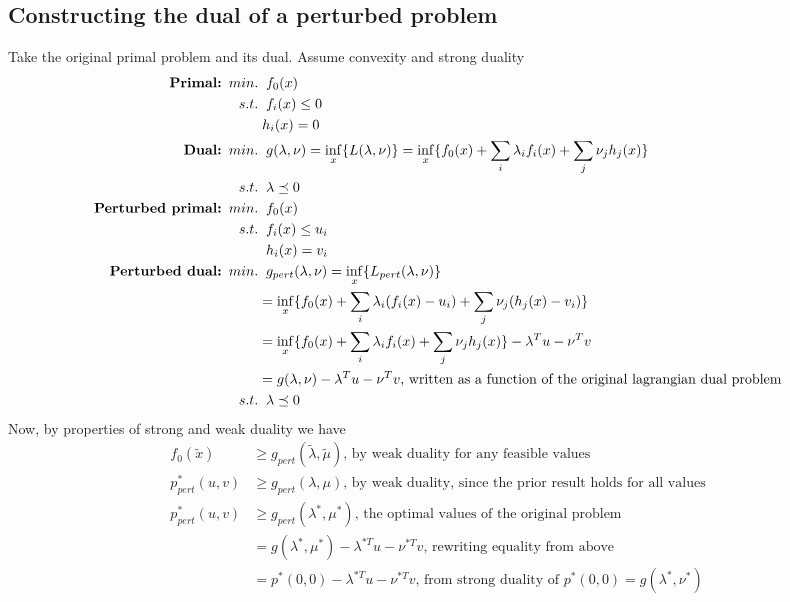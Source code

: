 \documentclass{article}
\begin{document}
\subsection{Constructing the dual of a perturbed problem}
Take the original primal problem and its dual. Assume convexity and strong duality\\
\begin{align*}
  \textrm{\textbf{Primal: }}
  min. & \;\; f_0(x)\\
  s.t. & \;\; f_i(x) \leq 0\\
  & \; h_i(x) = 0\\
  \textrm{\textbf{Dual: }}
  min. & \;\; g(\lambda, \nu) = \inf_x\{L(\lambda, \nu)\} = \inf_x\{f_0(x) + \sum_i\lambda_if_i(x) + \sum_j\nu_jh_j(x)\}\\
  s.t. & \;\; \lambda \preceq 0\\
  \textrm{\textbf{Perturbed primal: }}
  min. & \;\; f_0(x)\\
  s.t. & \;\; f_i(x) \leq u_i\\
  & \;\; h_i(x) = v_i\\
  \textrm{\textbf{Perturbed dual: }}
  min. & \;\; g_{pert}(\lambda, \nu) = \inf_x\{L_{pert}(\lambda, \nu)\}\\
  &= \inf_x\{f_0(x) + \sum_i\lambda_i(f_i(x) - u_i) + \sum_j\nu_j(h_j(x) - v_i)\}\\
  &= \inf_x\{f_0(x) + \sum_i\lambda_if_i(x) + \sum_j\nu_jh_j(x)\} - \lambda^Tu - \nu^Tv\\
  &= g(\lambda, \nu)- \lambda^Tu - \nu^Tv \textrm{, written as a function of the original lagrangian dual problem}\\
  s.t. & \;\; \lambda \preceq 0\\  
\end{align*}
Now, by properties of strong and weak duality we have
\begin{align*}
  f_0(\tilde{x}) &\geq g_{pert}(\tilde{\lambda}, \tilde{\mu}) \textrm{, by weak duality for any feasible values}\\
  p^*_{pert}(u, v) &\geq g_{pert}(\lambda, \mu) \text{, by weak duality, since the prior result holds for all values}\\
  p^*_{pert}(u, v) &\geq g_{pert}(\lambda^*, \mu^*) \text{, the optimal values of the original problem}\\
  &= g(\lambda^*, \mu^*) - \lambda^{*T}u - \nu^{*T}v \text{, rewriting equality from above}\\
  &= p^*(0,0) - \lambda^{*T}u - \nu^{*T}v \text{, from strong duality of } p^*(0,0) = g(\lambda^*, \nu^*)\\
\end{align*}
\end{document}
